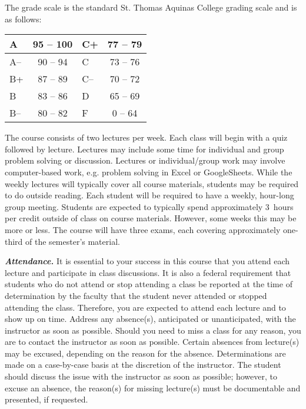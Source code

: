 \documentclass[11pt,letterpaper]{article}
\begin{document}
The grade scale is the standard St. Thomas Aquinas College grading scale and is as follows: \par
        \begin{table}[!ht]
        \centering
        \begin{tabular}{|l||c|l||c|} \hline
        A & 95 -- 100 & C+ & 77 -- 79 \\ \hline
        A-- & 90 -- 94 & C & 73 -- 76 \\ \hline
        B+ & 87 -- 89 & C-- & 70 -- 72 \\ \hline
        B & 83 -- 86 & D & 65 -- 69 \\ \hline
        B-- & 80 -- 82 & F & 0 -- 64 \\ \hline
        \end{tabular}
        \end{table}
\sectionbreak





\newpage





The course consists of two lectures per week. Each class will begin with a quiz followed by lecture. Lectures may include some time for individual and group problem solving or discussion. Lectures or individual/group work may involve computer-based work, e.g. problem solving in Excel or GoogleSheets. While the weekly lectures will typically cover all course materials, students may be required to do outside reading. Each student will be required to have a weekly, hour-long group meeting. Students are expected to typically spend approximately 3~hours per credit outside of class on course materials. However, some weeks this may be more or less. The course will have three exams, each covering approximately one-third of the semester's material. 
\sectionbreak



{\itshape\bfseries\color{stacred}Attendance.} It is essential to your success in this course that you attend each lecture and participate in class discussions. It is also a federal requirement that students who do not attend or stop attending a class be reported at the time of determination by the faculty that the student never attended or stopped attending the class. Therefore, you are expected to attend each lecture and to show up on time. Address any absence(s), anticipated or unanticipated, with the instructor as soon as possible. Should you need to miss a class for any reason, you are to contact the instructor as soon as possible. Certain absences from lecture(s) may be excused, depending on the reason for the absence. Determinations are made on a case-by-case basis at the discretion of the instructor. The student should discuss the issue with the instructor as soon as possible; however, to excuse an absence, the reason(s) for missing lecture(s) must be documentable and presented, if requested. \pspace
\end{document}
